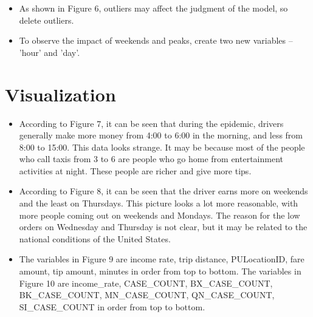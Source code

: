 \documentclass[11pt]{article}
\begin{document}
\begin{itemize}
    \item As shown in Figure 6, outliers may affect the judgment of the model, so delete outliers.
\end{itemize}
\begin{itemize}
    \item To observe the impact of weekends and peaks, create two new variables – 'hour' and 'day'.
\end{itemize}
\section{Visualization}
\begin{itemize}
    \item According to Figure 7, it can be seen that during the epidemic, drivers generally make more money from 4:00 to 6:00 in the morning, and less from 8:00 to 15:00. This data looks strange. It may be because most of the people who call taxis from 3 to 6 are people who go home from entertainment activities at night. These people are richer and give more tips.
\end{itemize}
\begin{itemize}
    \item According to Figure 8, it can be seen that the driver earns more on weekends and the least on Thursdays. This picture looks a lot more reasonable, with more people coming out on weekends and Mondays. The reason for the low orders on Wednesday and Thursday is not clear, but it may be related to the national conditions of the United States.
\end{itemize}
\begin{itemize}
    \item The variables in Figure 9 are income rate, trip distance, PULocationID, fare amount, tip amount, minutes in order from top to bottom. The variables in Figure 10 are income\_rate, CASE\_COUNT,	BX\_CASE\_COUNT, BK\_CASE\_COUNT,	MN\_CASE\_COUNT,	QN\_CASE\_COUNT, SI\_CASE\_COUNT in order from top to bottom. 
\end{itemize}
\end{document}
